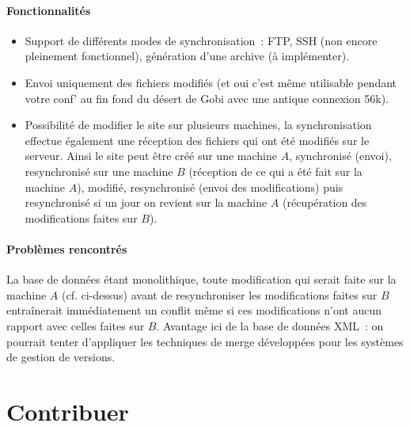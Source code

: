 \documentclass[final,11pt,a4paper,twoside,titlepage]{article}
\begin{document}
{    \subsection{Fonctionnalités}
    \begin{itemize}
    \item Support de différents modes de synchronisation~: FTP, SSH (non encore
      pleinement fonctionnel), génération d'une archive (à implémenter).
    \item Envoi uniquement des fichiers modifiés (et oui c'est même utilisable pendant
      votre conf' au fin fond du désert de Gobi avec une antique connexion 56k).
    \item Possibilité de modifier le site sur plusieurs machines, la synchronisation
      effectue également une réception des fichiers qui ont été modifiés sur le serveur.
      Ainsi le site peut être créé sur une machine $A$, synchronisé (envoi), resynchronisé
      sur une machine $B$ (réception de ce qui a été fait sur la machine $A$), modifié,
      resynchronisé (envoi des modifications) puis resynchronisé si un jour on revient
      sur la machine $A$ (récupération des modifications faites sur $B$).
    \end{itemize}

    \subsection{Problèmes rencontrés}
    La base de données étant monolithique, toute modification qui serait faite sur la machine $A$
    (cf. ci-dessus) avant de resynchroniser les modifications faites sur $B$ entraînerait
    immédiatement un conflit même si ces modifications n'ont aucun
    rapport avec celles faites sur $B$.
    Avantage ici de la base de données XML~: on pourrait tenter
    d'appliquer les techniques de merge
    développées pour les systèmes de gestion de versions.


\part{Contribuer}
}
\end{document}
